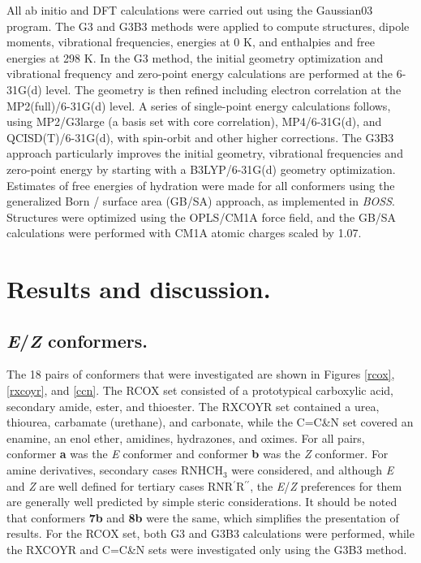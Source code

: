 \documentclass[12pt]{report}
\begin{document}
All ab initio and DFT calculations were carried out using the Gaussian03 program.\cite{gauss} The G3 and G3B3 methods were applied to compute structures, dipole moments, vibrational frequencies, energies at 0 K, and enthalpies and free energies at 298 K.\cite{curtiss,bab} In the G3 method, the initial geometry optimization and vibrational frequency and zero-point energy calculations are performed at the 6-31G(d) level. The geometry is then refined including electron correlation at the MP2(full)/6-31G(d) level. A series of single-point energy calculations follows, using MP2/G3large (a basis set with core correlation), MP4/6-31G(d), and QCISD(T)/6-31G(d), with spin-orbit and other higher corrections. The G3B3 approach particularly improves the initial geometry, vibrational frequencies and zero-point energy by starting with a B3LYP/6-31G(d) geometry optimization. Estimates of free energies of hydration were made for all conformers using the generalized Born / surface area (GB/SA) approach,\cite{still,qiu} as implemented in \textit{BOSS}\@.\cite{jorg2005,jorg2004} Structures were optimized using the OPLS/CM1A force field,\cite{jjez} and the GB/SA calculations were performed with CM1A atomic charges scaled by 1.07.\cite{jorg2004}


\section{Results and discussion.}

\subsection{\textit{E}/\textit{Z} conformers.}

The 18 pairs of conformers that were investigated are shown in Figures \ref{rcox}, \ref{rxcoyr}, and \ref{ccn}. The RCOX set consisted of a prototypical carboxylic acid, secondary amide, ester, and thioester. The RXCOYR set contained a urea, thiourea, carbamate (urethane), and carbonate, while the C=C\&N set covered an enamine, an enol ether, amidines, hydrazones, and oximes. For all pairs, conformer \textbf{a} was the \textit{E} conformer and conformer \textbf{b} was the \textit{Z} conformer. For amine derivatives, secondary cases RNHCH$_3$ were considered, and although \textit{E} and \textit{Z} are well defined for tertiary cases RNR$^{\prime}$R$^{\prime\prime}$, the \textit{E}/\textit{Z} preferences for them are generally well predicted by simple steric considerations. It should be noted that conformers \textbf{7b} and \textbf{8b} were the same, which simplifies the presentation of results. For the RCOX set, both G3 and G3B3 calculations were performed, while the RXCOYR and C=C\&N sets were investigated only using the G3B3 method.
\end{document}
